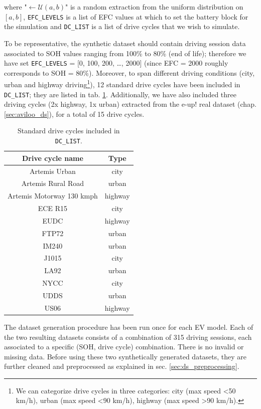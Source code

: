 where "$\leftarrow\mathcal{U}(a,b)$" is a random extraction from the uniform distribution on $[a,b]$, \texttt{EFC\_LEVELS} is a list of EFC values at which to set the battery block for the simulation and \texttt{DC\_LIST} is a list of drive cycles that we wish to simulate.

To be representative, the synthetic dataset should contain driving session data associated to SOH values ranging from 100\% to 80\% (end of life); therefore we have set \texttt{EFC\_LEVELS} = [0, 100, 200, \dots, 2000] (since EFC = 2000 roughly corresponds to SOH = 80\%). Moreover, to span different driving conditions (city, urban and highway driving\footnote{We can categorize drive cycles in three categories: city (max speed <50 km/h), urban (max speed <90 km/h), highway (max speed >90 km/h).}), 12 standard drive cycles \cite{drive_cycles} have been included in \texttt{DC\_LIST}; they are listed in tab. \ref{tab:dc_list}. Additionally, we have also included three driving cycles (2x highway, 1x urban) extracted from the e-up! real dataset (chap. \ref{sec:aviloo_ds}), for a total of 15 drive cycles.

\begin{table}[htb!]
\centering
\begin{tabular}[t]{cc}
\toprule
Drive cycle name & Type\\
\midrule
Artemis Urban & city\\
Artemis Rural Road & urban\\
Artemis Motorway 130 kmph & highway\\
ECE R15 & city\\
EUDC & highway\\
FTP72 & urban\\
IM240 & urban\\
J1015 & city\\
LA92 & urban\\
NYCC & city\\
UDDS & urban\\
US06 & highway\\
\bottomrule
\end{tabular}
\caption[Selected standard drive cycles]{Standard drive cycles included in \texttt{DC\_LIST}.}
\label{tab:dc_list}
\end{table}

The dataset generation procedure has been run once for each EV model. Each of the two resulting datasets consists of a combination of 315 driving sessions, each associated to a specific (SOH, drive cycle) combination. There is no invalid or missing data. Before using these two synthetically generated datasets, they are further cleaned and preprocessed as explained in sec. \ref{sec:ds_preprocessing}.